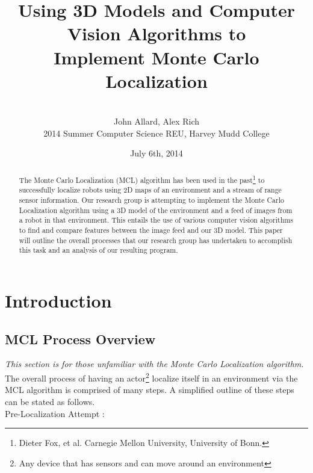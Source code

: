 \documentclass[a4paper,11pt]{article}
\title{Using 3D Models and Computer Vision Algorithms to \\ Implement Monte Carlo Localization}
\author{ \\[7in]  John Allard, Alex Rich \\ 2014 Summer Computer Science REU, Harvey Mudd College}
\date{July 6th, 2014 \\}
\begin{document}
  \maketitle   
  \newpage  
  
  \tableofcontents
  
  \newpage
 
  \begin{abstract}  
  The Monte Carlo Localization (MCL) algorithm has been used in the past\footnote{ Dieter Fox, et al. Carnegie Mellon University, University of Bonn.} to successfully localize robots using 2D maps of an environment and a stream of range  sensor information. Our research group is attempting to implement the Monte Carlo Localization algorithm using a 3D model of the environment and a feed of images from a robot in that environment. This entails the use of various computer vision algorithms to find and compare features between the image feed and our 3D model. This paper will outline the overall processes that our research group has undertaken to accomplish this task and an analysis of our resulting program. 
  \end{abstract}
  
  \section{Introduction} 
  
  \subsection{MCL Process Overview}
  \emph{This section is for those unfamiliar with the Monte Carlo Localization algorithm.}\\ The overall process of having an actor\footnote{Any device that has sensors and can move around an environment} localize itself in an environment via the MCL algorithm is comprised of many steps. A simplified outline of these steps can be stated as follows.\\
  
  Pre-Localization Attempt :
  
\end{document}
